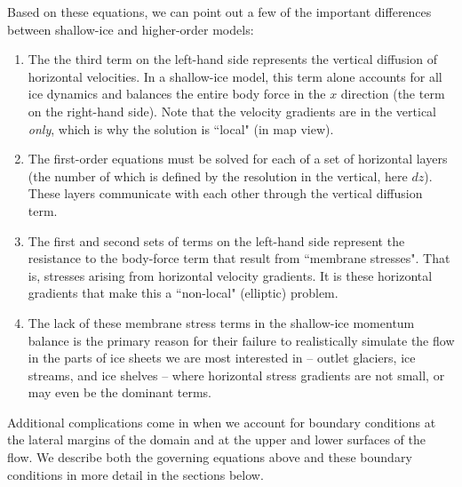 Based on these equations, we can point out a few of the important differences between shallow-ice and higher-order models: 
\begin{enumerate}
\item  The the third term on the left-hand side represents the vertical diffusion of horizontal velocities. In a shallow-ice model, this term alone accounts for all ice dynamics and balances the entire body force in the $x$ direction (the term on the right-hand side). Note that the velocity gradients are in the vertical \textit{only}, which is why the solution is ``local" (in map view).

\item  The first-order equations must be solved for each of a set of horizontal layers (the number of which is defined by the resolution in the vertical, here $dz$). These layers communicate with each other through the vertical diffusion term.

\item  The first and second sets of terms on the left-hand side represent the resistance to the body-force term that result from ``membrane stresses". That is, stresses arising from horizontal velocity gradients. It is these horizontal gradients that make this a ``non-local" (elliptic) problem.

\item  The lack of these membrane stress terms in the shallow-ice momentum balance is the primary reason for their failure to realistically simulate the flow in the parts of ice sheets we are most interested in -- outlet glaciers, ice streams, and ice shelves -- where horizontal stress gradients are not small, or may even be the dominant terms.  

\end{enumerate}

Additional complications come in when we account for boundary conditions at the lateral margins of the domain and at the upper and lower surfaces of the flow. We describe both the governing equations above and these boundary conditions in more detail in the sections below.

